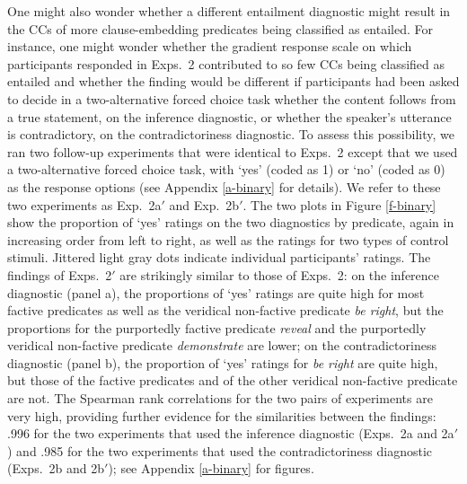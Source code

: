 \documentclass[11pt,fleqn]{article}
\newcommand{\6}{\mbox{$[\hspace*{-.6mm}[$}}
\newcommand{\9}{\mbox{$]\hspace*{-.6mm}]$}}
\begin{document}
{One might also wonder whether a different entailment diagnostic might result in the CCs of more clause-embedding predicates being classified as entailed. For instance, one might wonder whether the gradient response scale on which participants responded in Exps.~2 contributed to so few CCs being classified as entailed and whether the finding would be different if participants had been asked to decide in a two-alternative forced choice task whether the content follows from a true statement, on the inference diagnostic, or whether the speaker's utterance is contradictory, on the contradictoriness diagnostic. To assess this possibility, we ran two follow-up experiments that were identical to Exps.~2 except that we used a two-alternative forced choice task, with `yes' (coded as 1) or `no' (coded as 0) as the response options (see Appendix \ref{a-binary} for details). We refer to these two experiments as Exp.~2a$'$ and Exp.~2b$'$. The two plots in Figure \ref{f-binary} show the proportion of `yes' ratings on the two diagnostics by predicate, again in increasing order from left to right, as well as the ratings for two types of control stimuli. Jittered light gray dots indicate individual participants' ratings. The findings of Exps.~2$'$ are strikingly similar to those of Exps.~2: on the inference diagnostic (panel a), the proportions of `yes' ratings are quite high for most factive predicates as well as the veridical non-factive predicate {\em be right}, but the proportions for the purportedly factive predicate {\em reveal} and the purportedly veridical non-factive predicate {\em demonstrate} are lower; on the contradictoriness diagnostic (panel b), the proportion of `yes' ratings for {\em be right} are quite high, but those of the factive predicates and of the other veridical non-factive predicate are not. The Spearman rank correlations for the two pairs of experiments are very high, providing further evidence for the similarities between the findings: .996 for the two experiments that used the inference diagnostic (Exps.~2a and 2a$'$) and .985 for the two experiments that used the contradictoriness diagnostic (Exps.~2b and 2b$'$); see Appendix \ref{a-binary} for figures.

\begin{figure}[H]
\centering


\end{figure}}
\end{document}
